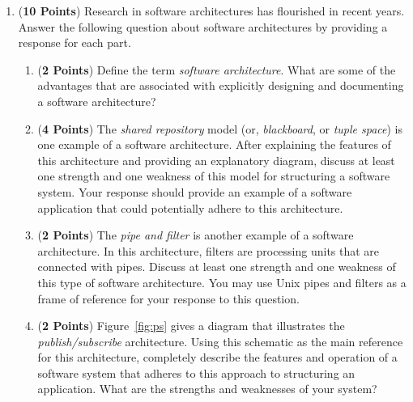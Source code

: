 \documentclass[12pt,epsf,psfig,graphics]{article}
\begin{document}
\begin{enumerate}
\newpage

\item ({\bf 10 Points}) Research in software architectures has flourished
in recent years.  Answer the following question about software architectures
by providing a response for each part.

\begin{enumerate}


\item ({\bf 2 Points}) Define the term {\em software architecture}.  What are some of the advantages that are associated
  with explicitly designing and documenting a software architecture? 

\item ({\bf 4 Points}) The {\em shared repository} model (or, {\em
  blackboard}, or {\em tuple space}) is one example of a software
  architecture.  After explaining the features of this architecture
  and providing an explanatory diagram, discuss at least one strength
  and one weakness of this model for structuring a software system.
  Your response should provide an example of a software application
  that could potentially adhere to this architecture.

\item ({\bf 2 Points}) The {\em pipe and filter} is another example of a software architecture.  In this architecture,
  filters are processing units that are connected with pipes.  Discuss at least one strength and one weakness of this
  type of software architecture.  You may use Unix pipes and filters as a frame of reference for your response to this
  question.

\item ({\bf 2 Points}) Figure~\ref{fig:ps} gives a diagram that
  illustrates the {\em publish/subscribe} architecture.  Using this
  schematic as the main reference for this architecture, completely
  describe the features and operation of a software system that
  adheres to this approach to structuring an application.  What are
  the strengths and weaknesses of your system?

\end{enumerate}


\end{enumerate}
\end{document}
